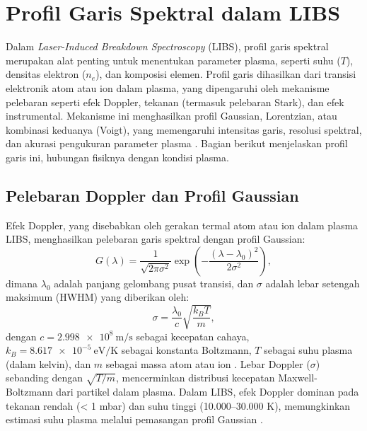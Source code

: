 \section{Profil Garis Spektral dalam LIBS}

Dalam \textit{Laser-Induced Breakdown Spectroscopy} (LIBS), profil garis spektral merupakan alat penting untuk menentukan parameter plasma, seperti suhu (\( T \)), densitas elektron (\( n_e \)), dan komposisi elemen. Profil garis dihasilkan dari transisi elektronik atom atau ion dalam plasma, yang dipengaruhi oleh mekanisme pelebaran seperti efek Doppler, tekanan (termasuk pelebaran Stark), dan efek instrumental. Mekanisme ini menghasilkan profil Gaussian, Lorentzian, atau kombinasi keduanya (Voigt), yang memengaruhi intensitas garis, resolusi spektral, dan akurasi pengukuran parameter plasma \citep{Demtroder2010,Griem1997}. Bagian berikut menjelaskan profil garis ini, hubungan fisiknya dengan kondisi plasma.

\subsection{Pelebaran Doppler dan Profil Gaussian}
Efek Doppler, yang disebabkan oleh gerakan termal atom atau ion dalam plasma LIBS, menghasilkan pelebaran garis spektral dengan profil Gaussian:
\begin{equation}
G(\lambda) = \frac{1}{\sqrt{2\pi \sigma^2}} \exp\left(-\frac{(\lambda - \lambda_0)^2}{2\sigma^2}\right), \label{eq:gaussian}
\end{equation}
dimana \( \lambda_0 \) adalah panjang gelombang pusat transisi, dan \( \sigma \) adalah lebar setengah maksimum (HWHM) yang diberikan oleh:
\begin{equation}
\sigma = \frac{\lambda_0}{c} \sqrt{\frac{k_B T}{m}}, \label{eq:sigma_doppler}
\end{equation}
dengan \( c = \SI{2.998e8}{\meter\per\second} \) sebagai kecepatan cahaya, \( k_B = \SI{8.617e-5}{\electronvolt\per\kelvin} \) sebagai konstanta Boltzmann, \( T \) sebagai suhu plasma (dalam kelvin), dan \( m \) sebagai massa atom atau ion \citep{Demtroder2010}. Lebar Doppler (\( \sigma \)) sebanding dengan \( \sqrt{T/m} \), mencerminkan distribusi kecepatan Maxwell-Boltzmann dari partikel dalam plasma. Dalam LIBS, efek Doppler dominan pada tekanan rendah (< 1 mbar) dan suhu tinggi (10.000–30.000 K), memungkinkan estimasi suhu plasma melalui pemasangan profil Gaussian \citep{Miziolek2006}.

